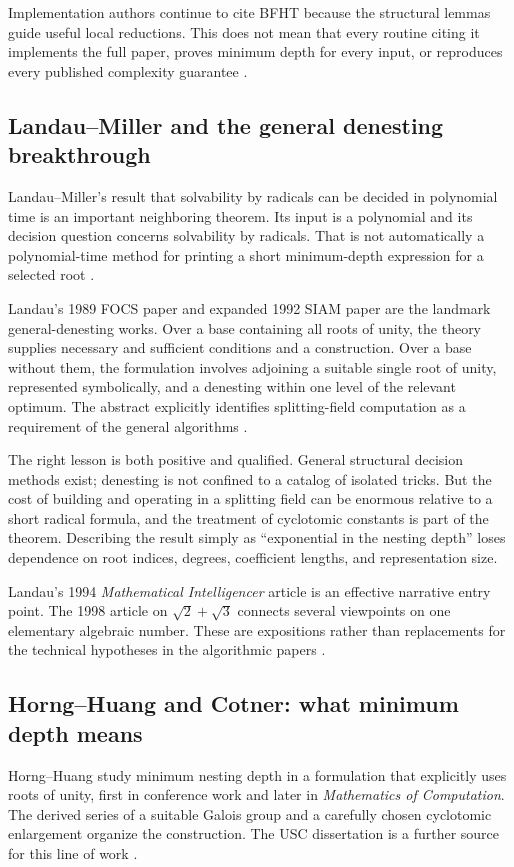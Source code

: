 \documentclass[11pt,letterpaper]{article}
\numberwithin{equation}{section}
\theoremstyle{definition}
\theoremstyle{remark}
\begin{document}
Implementation authors continue to cite BFHT because the structural lemmas guide useful local reductions. This does not mean that every routine citing it implements the full paper, proves minimum depth for every input, or reproduces every published complexity guarantee \cite{sympy,maxima,jeffrey}.

\subsection{Landau--Miller and the general denesting breakthrough}
Landau--Miller's result that solvability by radicals can be decided in polynomial time is an important neighboring theorem. Its input is a polynomial and its decision question concerns solvability by radicals. That is not automatically a polynomial-time method for printing a short minimum-depth expression for a selected root \cite{landaumiller}.

Landau's 1989 FOCS paper and expanded 1992 SIAM paper are the landmark general-denesting works. Over a base containing all roots of unity, the theory supplies necessary and sufficient conditions and a construction. Over a base without them, the formulation involves adjoining a suitable single root of unity, represented symbolically, and a denesting within one level of the relevant optimum. The abstract explicitly identifies splitting-field computation as a requirement of the general algorithms \cite{landau}.

The right lesson is both positive and qualified. General structural decision methods exist; denesting is not confined to a catalog of isolated tricks. But the cost of building and operating in a splitting field can be enormous relative to a short radical formula, and the treatment of cyclotomic constants is part of the theorem. Describing the result simply as ``exponential in the nesting depth'' loses dependence on root indices, degrees, coefficient lengths, and representation size.

Landau's 1994 \emph{Mathematical Intelligencer} article is an effective narrative entry point. The 1998 article on $\sqrt2+\sqrt3$ connects several viewpoints on one elementary algebraic number. These are expositions rather than replacements for the technical hypotheses in the algorithmic papers \cite{landau94,landauviews}.

\subsection{Horng--Huang and Cotner: what minimum depth means}
Horng--Huang study minimum nesting depth in a formulation that explicitly uses roots of unity, first in conference work and later in \emph{Mathematics of Computation}. The derived series of a suitable Galois group and a carefully chosen cyclotomic enlargement organize the construction. The USC dissertation is a further source for this line of work \cite{hornghuang,horngthesis}.
\end{document}
